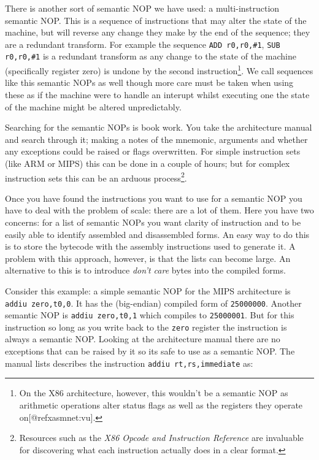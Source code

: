 \documentclass[10pt,]{book}
\begin{document}
There is another sort of semantic NOP we have used: a multi-instruction
semantic NOP. This is a sequence of instructions that may alter the
state of the machine, but will reverse any change they make by the end
of the sequence; they are a redundant transform. For example the
sequence \lstinline!ADD r0,r0,#1!, \lstinline!SUB r0,r0,#1! is a
redundant transform as any change to the state of the machine
(specifically register zero) is undone by the second
instruction\footnote{On the X86
  architecture\autocite{IntelCorporation:1997ta}, however, this wouldn't
  be a semantic NOP as arithmetic operations alter status flags as well
  as the registers they operate on{[}@refxasmnet:vu{]}.}. We call
sequences like this semantic NOPs as well though more care must be taken
when using these as if the machine were to handle an interupt whilst
executing one the state of the machine might be altered unpredictably.

Searching for the semantic NOPs is book work. You take the architecture
manual and search through it; making a notes of the mnemonic, arguments
and whether any exceptions could be raised or flags overwritten. For
simple instruction sets (like ARM or MIPS) this can be done in a couple
of hours; but for complex instruction sets this can be an arduous
process\footnote{Resources such as the \emph{X86 Opcode and Instruction
  Reference} \autocite{refx86} are invaluable for discovering what each
  instruction actually does in a clear format.}.

Once you have found the instructions you want to use for a semantic NOP
you have to deal with the problem of scale: there are a lot of them.
Here you have two concerns: for a list of semantic NOPs you want clarity
of instruction and to be easily able to identify assembled and
disassembled forms. An easy way to do this is to store the bytecode with
the assembly instructions used to generate it. A problem with this
approach, however, is that the lists can become large. An alternative to
this is to introduce \emph{don't care} bytes into the compiled forms.

Consider this example: a simple semantic NOP for the MIPS architecture
is \lstinline!addiu zero,t0,0!. It has the (big-endian) compiled form of
\lstinline!25000000!. Another semantic NOP is
\lstinline!addiu zero,t0,1! which compiles to \lstinline!25000001!. But
for this instruction so long as you write back to the \lstinline!zero!
register the instruction is always a semantic NOP. Looking at the
architecture manual\autocite{MIPSTechnologiesInc:2011ta} there are no
exceptions that can be raised by it so its safe to use as a semantic
NOP. The manual lists describes the instruction
\lstinline!addiu rt,rs,immediate! as:
\end{document}
